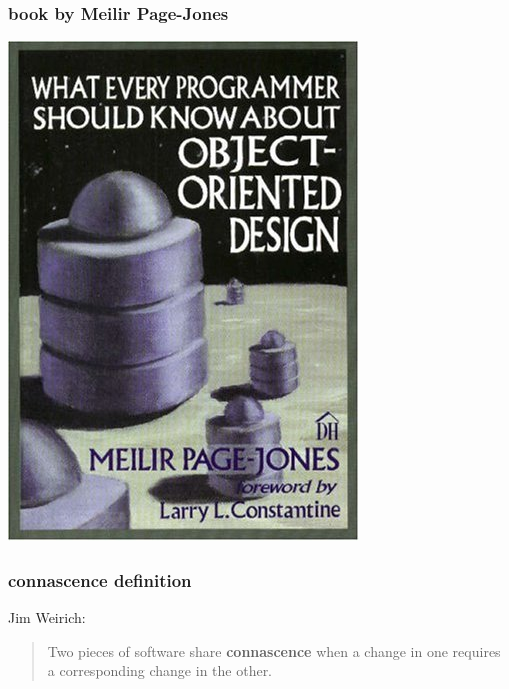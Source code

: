 \documentclass[aspectratio=169,12pt,xcolor=dvipsnames]{beamer}
\begin{document}
\begin{frame}
  \frametitle{book by Meilir Page-Jones}
  \begin{center}
    \includegraphics[height=.8\textheight]{meilir}
  \end{center}
\end{frame}

\begin{frame}
  \frametitle{connascence definition}
  Jim Weirich:\bigskip\\
  \begin{quote}
    Two pieces of software share \textbf{connascence} when a change in one requires a corresponding change in the other.
  \end{quote}
\end{frame}
\end{document}
